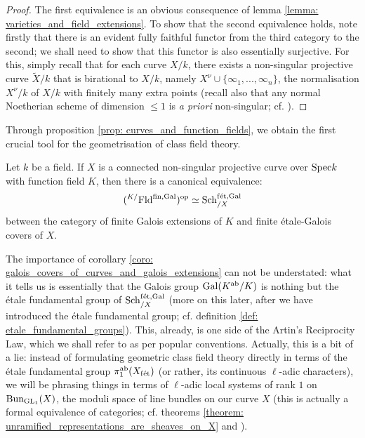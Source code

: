                 \begin{proof}
                    The first equivalence is an obvious consequence of lemma \ref{lemma: varieties_and_field_extensions}. To show that the second equivalence holds, note firstly that there is an evident fully faithful functor from the third category to the second; we shall need to show that this functor is also essentially surjective. For this, simply recall that for each curve $X/k$, there exists a non-singular projective curve $\tilde{X}/k$ that is birational to $X/k$, namely $X^{\nu} \cup \{\infty_1, ..., \infty_n\}$, the normalisation $X^{\nu}/k$ of $X/k$ with finitely many extra points (recall also that any normal Noetherian scheme of dimension $\leq 1$ is \textit{a priori} non-singular; cf. \cite[\href{https://stacks.math.columbia.edu/tag/0BX2}{Tag 0BX2}]{stacks}).
                \end{proof}
                
            Through proposition \ref{prop: curves_and_function_fields}, we obtain the first crucial tool for the geometrisation of class field theory.
            \begin{corollary} \label{coro: galois_covers_of_curves_and_galois_extensions}
                Let $k$ be a field. If $X$ is a connected non-singular projective curve over $\mathrm{Spec} k$ with function field $K$, then there is a canonical equivalence:
                    $$({}^{K/}\mathrm{Fld}^{\mathrm{fin}, \mathrm{Gal}})^{\mathrm{op}} \simeq \mathrm{Sch}_{/X}^{\mathrm{f\acute{e}t}, \mathrm{Gal}}$$
                between the category of finite Galois extensions of $K$ and finite \'etale-Galois covers of $X$. 
            \end{corollary}
            The importance of corollary \ref{coro: galois_covers_of_curves_and_galois_extensions} can not be understated: what it tells us is essentially that the Galois group $\mathrm{Gal}(K^{\mathrm{ab}}/K)$ is nothing but the \'etale fundamental group of $\mathrm{Sch}_{/X}^{\mathrm{f\acute{e}t}, \mathrm{Gal}}$ (more on this later, after we have introduced the \'etale fundamental group; cf. definition \ref{def: etale_fundamental_groups}). This, already, is one side of the Artin's Reciprocity Law, which we shall refer to as  per popular conventions. Actually, this is a bit of a lie: instead of formulating geometric class field theory directly in terms of the \'etale fundamental group $\pi_1^{\mathrm{ab}}(X_{\mathrm{f\acute{e}t}})$ (or rather, its continuous $\ell$-adic characters), we will be phrasing things in terms of $\ell$-adic local systems of rank $1$ on $\mathrm{Bun}_{\operatorname{GL}_1}(X)$, the moduli space of line bundles on our curve $X$ (this is actually a formal equivalence of categories; cf. theorems \ref{theorem: unramified_representations_are_sheaves_on_X} and ). 
            
